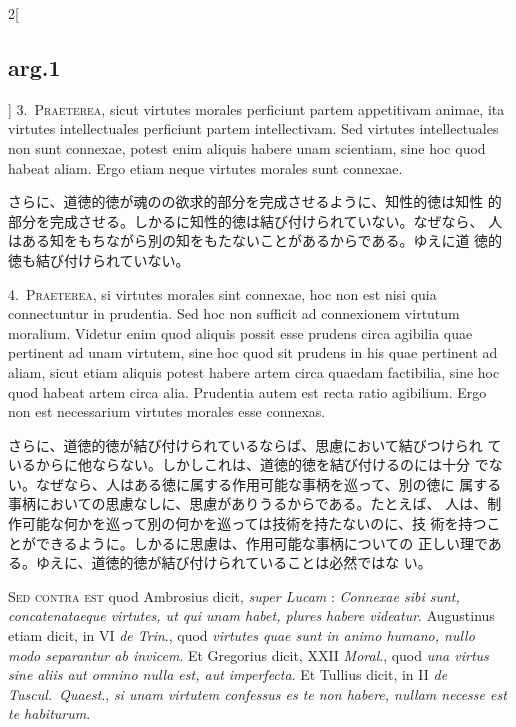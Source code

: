 \documentclass[paper=a4paper,fontsize=10pt,jafontsize=9pt,titlepage]{jlreq}
\begin{document}
\begin{paracol}{2}[\subsection{arg.1}]
3.~{\scshape Praeterea}, sicut virtutes morales perficiunt partem
appetitivam animae, ita virtutes intellectuales perficiunt partem
intellectivam. Sed virtutes intellectuales non sunt connexae, potest
enim aliquis habere unam scientiam, sine hoc quod habeat aliam. Ergo
etiam neque virtutes morales sunt connexae.

\switchcolumn

さらに、道徳的徳が魂のの欲求的部分を完成させるように、知性的徳は知性
 的部分を完成させる。しかるに知性的徳は結び付けられていない。なぜなら、
 人はある知をもちながら別の知をもたないことがあるからである。ゆえに道
 徳的徳も結び付けられていない。


4.~{\scshape Praeterea}, si virtutes morales sint connexae, hoc non
est nisi quia connectuntur in prudentia. Sed hoc non sufficit ad
connexionem virtutum moralium. Videtur enim quod aliquis possit esse
prudens circa agibilia quae pertinent ad unam virtutem, sine hoc quod
sit prudens in his quae pertinent ad aliam, sicut etiam aliquis potest
habere artem circa quaedam factibilia, sine hoc quod habeat artem
circa alia. Prudentia autem est recta ratio agibilium. Ergo non est
necessarium virtutes morales esse connexas.

\switchcolumn

さらに、道徳的徳が結び付けられているならば、思慮において結びつけられ
 ているからに他ならない。しかしこれは、道徳的徳を結び付けるのには十分
 でない。なぜなら、人はある徳に属する作用可能な事柄を巡って、別の徳に
 属する事柄においての思慮なしに、思慮がありうるからである。たとえば、
 人は、制作可能な何かを巡って別の何かを巡っては技術を持たないのに、技
 術を持つことができるように。しかるに思慮は、作用可能な事柄についての
 正しい理である。ゆえに、道徳的徳が結び付けられていることは必然ではな
 い。

\switchcolumn*[\subsection{s.c.}]

{\scshape Sed contra est} quod Ambrosius dicit, {\itshape super Lucam}
: {\itshape Connexae sibi sunt, concatenataeque virtutes, ut qui unam
habet, plures habere videatur}. Augustinus etiam dicit, in VI
{\itshape de Trin}., quod {\itshape virtutes quae sunt in animo
humano, nullo modo separantur ab invicem}. Et Gregorius dicit, XXII
{\itshape Moral}., quod {\itshape una virtus sine aliis aut omnino
nulla est, aut imperfecta}. Et Tullius dicit, in II {\itshape de
Tuscul.~Quaest}., {\itshape si unam virtutem confessus es te non
habere, nullam necesse est te habiturum}.


\end{paracol}
\end{document}
